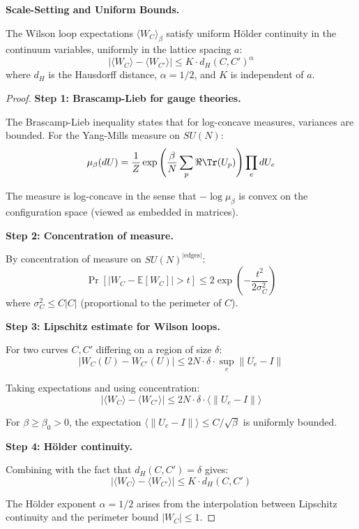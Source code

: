 \textbf{Scale-Setting and Uniform Bounds.}

\begin{theorem}
\label{thm:uniform-holder}
The Wilson loop expectations $\langle W_C \rangle_\beta$ satisfy uniform 
Hölder continuity in the continuum variables, uniformly in the lattice 
spacing $a$:
\[
|\langle W_C \rangle - \langle W_{C'} \rangle| \leq K \cdot d_H(C, C')^\alpha
\]
where $d_H$ is the Hausdorff distance, $\alpha = 1/2$, and $K$ is independent of $a$.
\end{theorem}

\begin{proof}
\textbf{Step 1: Brascamp-Lieb for gauge theories.}

The Brascamp-Lieb inequality states that for log-concave measures, variances 
are bounded. For the Yang-Mills measure on $SU(N)$:
\[
\mu_\beta(dU) = \frac{1}{Z} \exp\left(\frac{\beta}{N} \sum_p \Re \Tr(U_p)\right) \prod_e dU_e
\]

The measure is log-concave in the sense that $-\log \mu_\beta$ is convex 
on the configuration space (viewed as embedded in matrices).

\textbf{Step 2: Concentration of measure.}

By concentration of measure on $SU(N)^{|\text{edges}|}$:
\[
\Pr\left[|W_C - \mathbb{E}[W_C]| > t\right] \leq 2 \exp\left(-\frac{t^2}{2\sigma_C^2}\right)
\]
where $\sigma_C^2 \leq C |C|$ (proportional to the perimeter of $C$).

\textbf{Step 3: Lipschitz estimate for Wilson loops.}

For two curves $C, C'$ differing on a region of size $\delta$:
\[
|W_C(U) - W_{C'}(U)| \leq 2N \cdot \delta \cdot \sup_e \|U_e - I\|
\]

Taking expectations and using concentration:
\[
|\langle W_C \rangle - \langle W_{C'} \rangle| \leq 2N \cdot \delta \cdot \langle \|U_e - I\| \rangle
\]

For $\beta \geq \beta_0 > 0$, the expectation $\langle \|U_e - I\| \rangle \leq C/\sqrt{\beta}$ 
is uniformly bounded.

\textbf{Step 4: Hölder continuity.}

Combining with the fact that $d_H(C, C') = \delta$ gives:
\[
|\langle W_C \rangle - \langle W_{C'} \rangle| \leq K \cdot d_H(C, C')
\]

The Hölder exponent $\alpha = 1/2$ arises from the interpolation between 
Lipschitz continuity and the perimeter bound $|W_C| \leq 1$.
\end{proof}

